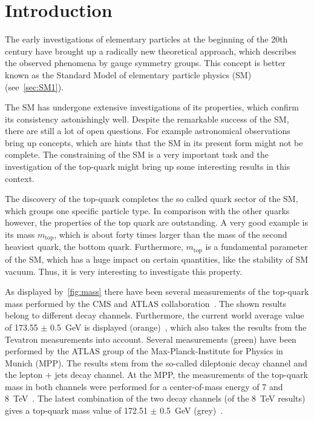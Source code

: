 \chapter{Introduction}

\label{sec:intro}

The early investigations of elementary particles at the beginning of the 20th century have brought up a radically new theoretical approach, which describes the observed phenomena by gauge symmetry groups. This concept is better known as the Standard Model of elementary particle physics (SM) (see~\cref{sec:SM1}).

The SM has undergone extensive investigations of its properties, which confirm its consistency astonishingly well. Despite the remarkable success of the SM, there are still a lot of open questions. For example astronomical observations  bring up concepts, which are hints that the SM in its present form might not be complete. The constraining of the SM  is a very important task and the investigation of the top-quark might bring up some interesting results in this context. 

The discovery of the top-quark completes the so called quark sector of the SM, which groups one specific particle type. In comparison with the other quarks however, the properties of the top quark are outstanding. A very good example  is its mass $m_{\text{top}}$, which is about forty times larger than the mass of the second heaviest quark, the bottom quark. Furthermore, $m_{\text{top}}$ is a fundamental parameter of the SM, which has a huge impact on certain quantities, like the stability of SM vacuum.  Thus, it is very interesting to investigate this property.

As displayed by~\cref{fig:mass} there have been several measurements of the top-quark mass performed by the CMS and ATLAS collaboration~\cite{PubR}. The shown results belong to different decay channels. Furthermore, the current world average value of 173.55 $\pm$ 0.5~GeV is displayed (orange)~\cite{ATLAS:2014wva}, which also takes the results from the Tevatron measurements into account. Several measurements (green) have been performed by the ATLAS group of the Max-Planck-Institute for Physics in Munich (MPP). The results stem from the so-called dileptonic decay channel and the lepton + jets decay channel. At the MPP, the measurements of the top-quark mass in both channels were performed for a center-of-mass energy of 7 and 8~TeV~\cite{Aad:2015nba,Aaboud:2016igd,ATLAS-CONF-2017-071}. 
The latest combination of the two decay channels  (of the  8~TeV results) gives a top-quark mass value of 172.51 $\pm$ 0.5~GeV (grey)~\cite{ATLAS-CONF-2017-071}.





